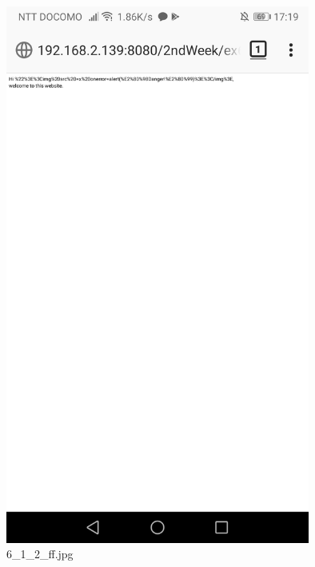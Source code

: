 \documentclass[a4j]{jarticle}
\begin{document}
  \vspace{1cm}
  \begin{figure}[htbp]
    \centering
    \includegraphics[width=10cm]{../webapp/png/6_1_2ff.jpg}
    \caption{6\_1\_2\_ff.jpg}
  \end{figure}
\end{document}
